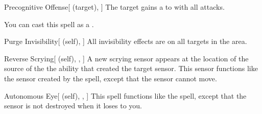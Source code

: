 \lowercase{\hypertarget{spell:Precognitive Offense}{}}\label{spell:Precognitive Offense}
\begin{attuneability}[\nth{2}]{\hypertarget{spell:Precognitive Offense}{Precognitive Offense}}[ (target), ]
The target gains a   to  with all attacks.

You can cast this spell as a .
\end{attuneability}
\vspace{0.25em}



\lowercase{\hypertarget{spell:Purge Invisibility}{}}\label{spell:Purge Invisibility}
\begin{attuneability}[\nth{2}]{\hypertarget{spell:Purge Invisibility}{Purge Invisibility}}[ (self), ]
All invisibility effects are  on all targets in the area.
\end{attuneability}
\vspace{0.25em}



\lowercase{\hypertarget{spell:Reverse Scrying}{}}\label{spell:Reverse Scrying}
\begin{attuneability}[\nth{2}]{\hypertarget{spell:Reverse Scrying}{Reverse Scrying}}[ (self), , ]
A new scrying sensor appears at the location of the source of the the ability that created the target sensor.
This sensor functions like the sensor created by the  spell, except that the sensor cannot move.
\end{attuneability}
\vspace{0.25em}



\lowercase{\hypertarget{spell:Autonomous Eye}{}}\label{spell:Autonomous Eye}
\begin{attuneability}[\nth{3}]{\hypertarget{spell:Autonomous Eye}{Autonomous Eye}}[ (self), , ]
This spell functions like the  spell, except that the sensor is not destroyed when it loses  to you.
\end{attuneability}
\vspace{0.25em}



